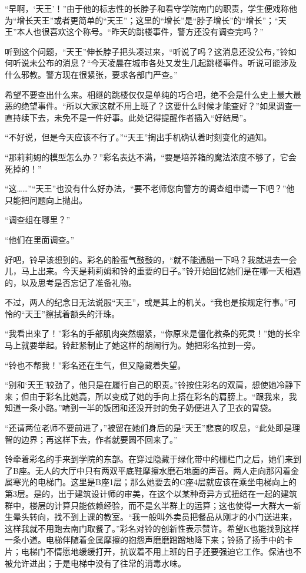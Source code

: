 “早啊，‘天王’！”由于他的标志性的长脖子和看守学院南门的职责，学生便戏称他为“增长天王”或者更简单的“天王”；这里的“增长”是“脖子增长”的“增长”；“天王”本人也很喜欢这个称号。“昨天的跳楼事件，警方还没有调查完吗？”

听到这个问题，“天王”伸长脖子把头凑过来，“听说了吗？这消息还没公布，”铃如何听说未公布的消息？“今天凌晨在城市各处又发生几起跳楼事件。听说可能涉及什么邪教。警方现在很紧张，要求各部门严查。”

希望不要查出什么来。相继的跳楼仅仅是单纯的巧合吧，绝不会是什么史上最大最恶的绝望事件。“所以大家这就不用上班了？这要什么时候才能查好？”如果调查一直持续下去，未免不是一件好事。此处记得提醒作者插入“好结局”。

“不好说，但是今天应该不行了。”“天王”掏出手机确认着时刻变化的通知。

“那莉莉姆的模型怎么办？”彩名表达不满，“要是培养箱的魔法浓度不够了，它会死掉的！”

“这……”“天王”也没有什么好办法，“要不老师您向警方的调查组申请一下吧？”他只能把问题向上抛出。

“调查组在哪里？”

“他们在里面调查。”

好吧，铃早该想到的。彩名的脸蛋气鼓鼓的，“就不能通融一下吗？我就进去一会儿，马上出来。今天是莉莉姆和铃的重要的日子。”铃开始回忆她们是在哪一天相遇的，以及思考是否忘记了准备礼物。

不过，两人的纪念日无法说服“天王”，或是其上的机关。“我也是按规定行事。”可怜的“天王”擦拭着额头的汗珠。

“我看出来了！”彩名的手部肌肉突然绷紧，“你原来是僵化教条的死灵！”她的长伞马上就要举起。铃赶紧制止了她这样的胡闹行为。她把彩名拉到一旁。

“铃也不帮我！”彩名还在生气，但又隐藏着失望。

“别和‘天王’较劲了，他只是在履行自己的职责。”铃按住彩名的双肩，想使她冷静下来；但由于彩名比她高，所以变成了她的手向上搭在彩名的肩膀上。“跟我来，我知道一条小路。”啃到一半的饭团和还没开封的兔子奶便进入了卫衣的胃袋。

“还请两位老师不要前进了，”被留在她们身后的是“天王”悲哀的叹息，“此处即是理智的边界；再这样下去，作者就要圆不回来了。”

铃牵着彩名的手来到学院的东部。在穿过隐藏于绿化带中的栅栏门之后，她们来到了B座。无人的大厅中只有两双平底鞋摩擦水磨石地面的声音。两人走向那闪着金属寒光的电梯门。这里是B座1层；那么她要去的C座4层就应该在乘坐电梯向上的第3层。是的，出于建筑设计师的审美，在这个以某种奇异方式扭结在一起的建筑群中，楼层的计算只能依赖经验，而不是幺半群上的运算；这也使得一大群大一新生晕头转向，找不到上课的教室。“我一般叫外卖员把餐品从刚才的小门送进来，这样我就不用跑去南门取餐了。”彩名对铃的创新性表示赞许。希望K也能找到这样一条小道。电梯伴随着金属摩擦的抱怨声磨磨蹭蹭地降下来；铃扬了扬手中的卡片；电梯门不情愿地缓缓打开，抗议着不用上班的日子还要强迫它工作。保洁也不被允许进出；于是电梯中没有了往常的消毒水味。

